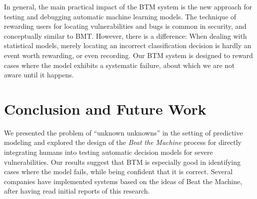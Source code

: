 In general, the main practical impact of the BTM system is the new approach for testing and debugging automatic machine learning models. The technique of rewarding users for locating vulnerabilities and bugs is common in security, and conceptually similar to BMT. However, there is a difference: When dealing with statistical models, merely locating an incorrect classification decision is hardly an event worth rewarding, or even recording. Our BTM system is designed to reward cases where the model exhibits a systematic failure, about which we are not aware until it happens.

\section{Conclusion and Future Work}


We presented the problem of ``unknown unknowns'' in the setting of predictive modeling and explored the design of the \emph{Beat the Machine} process for directly integrating humans into testing automatic decision models for severe vulnerabilities. Our results suggest that BTM is especially good in identifying cases where the model fails, while being confident that it is correct.   Several companies have implemented systems based on the ideas of Beat the Machine, after having read initial reports of this research.


